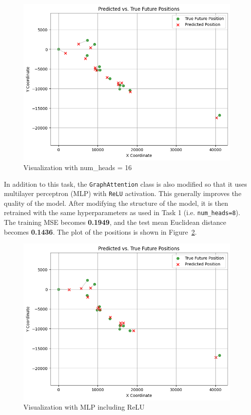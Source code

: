 \documentclass[conference]{IEEEtran}
\begin{document}
\begin{figure}[htbp]
    \centering
    \includegraphics[width=0.8\linewidth]{figvisual2.png}
    \caption{Visualization with num\_heads = 16}
    \label{fig:visual2}
\end{figure}

In addition to this task, the \texttt{GraphAttention} class is also modified
so that it uses multilayer perceptron (MLP) with \texttt{ReLU} activation.
This generally improves the quality of the model. After modifying the structure
of the model, it is then retrained with the same hyperparameters as used in
Task 1 (i.e. \texttt{num\_heads=8}). The training MSE becomes \textbf{0.1949},
and the test mean Euclidean distance becomes \textbf{0.1436}. The plot of the
positions is shown in Figure~\ref{fig:visual25}.

\begin{figure}[htbp]
    \centering
    \includegraphics[width=0.8\linewidth]{figvisual25.png}
    \caption{Visualization with MLP including ReLU}
    \label{fig:visual25}
\end{figure}
\end{document}
